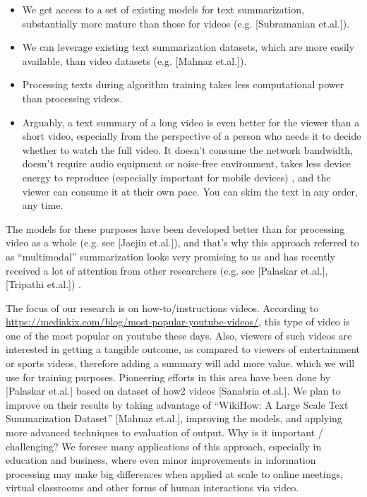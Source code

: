\documentclass{article}
\begin{document}
\begin{itemize}

\item We get access to a set of existing models for text summarization, substantially more mature than those for videos (e.g. [Subramanian et.al.]).
\item We can leverage existing text summarization datasets, which are more easily available, than video datasets (e.g. [Mahnaz et.al.]).
\item  Processing texts during algorithm training takes less computational power than processing videos.
\item  Arguably, a text summary of a long video is even better for the viewer than a short video, especially from the perspective of a person who needs it to decide whether to watch the full video.  It doesn’t consume the network bandwidth, doesn’t require audio equipment or noise-free environment, takes less device energy to reproduce (especially important for mobile devices) , and the viewer can consume it at their own pace.  You can skim the text in any order, any time. 

\end{itemize}


The models for these purposes have been developed better than for processing video as a whole (e.g. see [Jaejin et.al.]), and that’s why this approach referred to as “multimodal” summarization looks very promising to us and has recently received a lot of attention from other researchers (e.g. see [Palaskar et.al.], [Tripathi et.al.]) . 

The focus of our research is on how-to/instructions videos. According to \url{https://mediakix.com/blog/most-popular-youtube-videos/}, this type of video is one of the most popular on youtube these days.  Also, viewers of such videos are interested in getting a tangible outcome, as compared to viewers of entertainment or sports videos, therefore adding a summary will add more value. which we will use for training purposes. Pioneering efforts in this area have been done by [Palaskar et.al.] based on dataset of how2 videos [Sanabria et.al.]. We plan to improve on their results by taking advantage of “WikiHow: A Large Scale Text Summarization Dataset” [Mahnaz et.al.], improving the models, and applying more advanced techniques to evaluation of output.
Why is it important / challenging?
We foresee many applications of this approach, especially in education and business, where even minor improvements in information processing may make big differences when applied at scale to online meetings, virtual classrooms and other forms of human interactions via video. 
\end{document}
